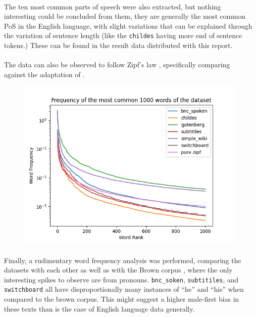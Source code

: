 \documentclass[11pt]{article}
\begin{document}
\paragraph{}
The ten most common parts of speech were also extracted, but nothing interesting could be concluded from them, they are generally the most common PoS in the English language, with slight variations that can be explained through the variation of sentence length (like the \verb|childes| having more end of sentence tokens.) These can be found in the result data distributed with this report.


\paragraph{}
The data can also be observed to follow Zipf's law \parencite{zipf2013psycho, zipf2016human}, specifically comparing against the adaptation of \textcite{mandelbrot1953informational}.
\begin{figure}[ht]
    \centering
    \includegraphics[width=\textwidth]{figures/zipf.png}
    \label{fig:zipf}
\end{figure}

\paragraph{}
Finally, a rudimentary word frequency analysis was performed, comparing the datasets with each other as well as with the Brown corpus \parencite{francis1979brown}, where the only interesting spikes to observe are from pronouns. \verb|bnc_soken|, \verb|subtitiles|, and \verb|switchboard| all have disproportionally many instances of ``he'' and ``his'' when compared to the brown corpus. This might suggest a higher male-first bias in these texts than is the case of English language data generally.
\end{document}
